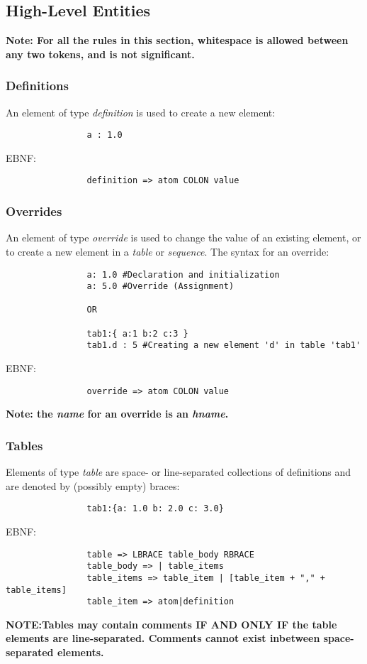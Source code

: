 \documentclass{memarticle}
\begin{document}
	\subsection{High-Level Entities}

		\bf Note: \rm For all the rules in this section,
		whitespace is allowed between any two tokens,
		and is not significant.
						
		\subsubsection{Definitions}
			An element of type \emph{definition} is used to
			create a new element:
			\begin{verbatim}
				a : 1.0
			\end{verbatim}
			\vspace{1mm}
			\par
			EBNF:
			\begin{verbatim}
				definition => atom COLON value
			\end{verbatim}	
			
		\subsubsection{Overrides}
			An element of type \emph{override} is used to
			change the value of an existing element,
			or to create a new element in a \emph{table} or \emph{sequence}.
			The syntax for an override:
			\begin{verbatim}
				a: 1.0 #Declaration and initialization
				a: 5.0 #Override (Assignment)
				
				OR
				
				tab1:{ a:1 b:2 c:3 }
				tab1.d : 5 #Creating a new element 'd' in table 'tab1'
			\end{verbatim}
			\vspace{1mm}
			EBNF:
			\begin{verbatim}
				override => atom COLON value
			\end{verbatim}	
			\bf Note: \rm the \emph{name} for an override 
			is an \emph{hname}.
		\subsubsection{Tables}
			Elements of type \emph{table} 
			are space- or line-separated collections of definitions 
			and are denoted by (possibly empty) braces:
			\begin{verbatim}
				tab1:{a: 1.0 b: 2.0 c: 3.0}
			\end{verbatim}
			\vspace{1mm}
			EBNF:
			\begin{verbatim}
				table => LBRACE table_body RBRACE
				table_body => | table_items
				table_items => table_item | [table_item + "," + table_items]
				table_item => atom|definition
			\end{verbatim}
			\par
			\bf NOTE:\rm Tables may contain comments 
			\bf IF AND ONLY IF \rm
			the table elements are line-separated. 
			Comments cannot exist inbetween space-separated elements.
\end{document}
